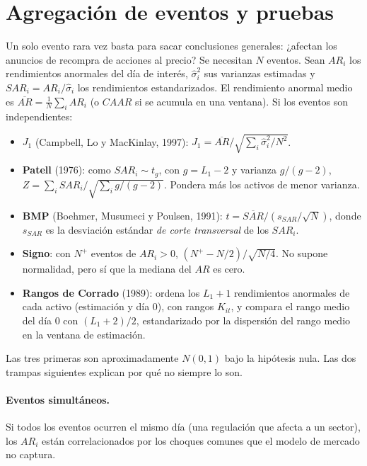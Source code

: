 \section{Agregación de eventos y pruebas}

Un solo evento rara vez basta para sacar conclusiones generales: ¿afectan los anuncios de recompra de acciones al
precio? Se necesitan $N$ eventos. Sean $AR_i$ los rendimientos anormales del día de interés, $\hat\sigma_i^2$ sus varianzas
estimadas y $SAR_i=AR_i/\hat\sigma_i$ los rendimientos estandarizados. El rendimiento anormal medio es
$\overline{AR}=\frac1N\sum_iAR_i$ (o $CAAR$ si se acumula en una ventana). Si los eventos son independientes:
\begin{itemize}[leftmargin=*]
  \item \textbf{$J_1$} (Campbell, Lo y MacKinlay, 1997): $J_1=\overline{AR}\big/\sqrt{\sum_i\hat\sigma_i^2/N^2}$.
  \item \textbf{Patell} (1976): como $SAR_i\sim t_{g}$, con $g=L_1-2$ y varianza $g/(g-2)$,
        $Z=\sum_iSAR_i\big/\sqrt{\sum_ig/(g-2)}$. Pondera más los activos de menor varianza.
  \item \textbf{BMP} (Boehmer, Musumeci y Poulsen, 1991): $t=\overline{SAR}\big/(s_{SAR}/\sqrt N)$, donde $s_{SAR}$ es la desviación
        estándar \emph{de corte transversal} de los $SAR_i$.
  \item \textbf{Signo}: con $N^+$ eventos de $AR_i>0$, $(N^+-N/2)/\sqrt{N/4}$. No supone normalidad, pero sí que la
        mediana del $AR$ es cero.
  \item \textbf{Rangos de Corrado} (1989): ordena los $L_1+1$ rendimientos anormales de cada activo (estimación y día 0),
        con rangos $K_{it}$, y compara el rango medio del día 0 con $(L_1+2)/2$, estandarizado por la dispersión del rango
        medio en la ventana de estimación.
\end{itemize}
Las tres primeras son aproximadamente $N(0,1)$ bajo la hipótesis nula. Las dos trampas siguientes explican por qué no
siempre lo son.

\paragraph{Eventos simultáneos.} Si todos los eventos ocurren el mismo día (una regulación que afecta a un sector), los
$AR_i$ están correlacionados por los choques comunes que el modelo de mercado no captura.

